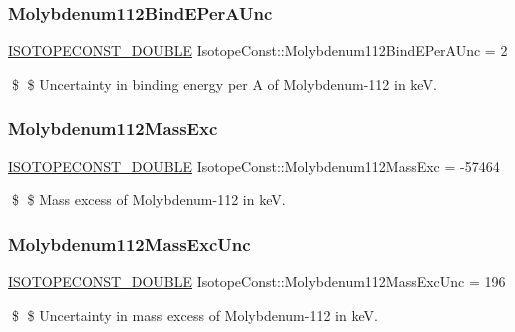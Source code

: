 \subsubsection{\texorpdfstring{Molybdenum112\+Bind\+E\+Per\+A\+Unc}{Molybdenum112BindEPerAUnc}}
{\footnotesize\ttfamily \mbox{\hyperlink{group___isotope_const-_macros_ga8f45a7272ce02c0b4c65c44636ed719a}{I\+S\+O\+T\+O\+P\+E\+C\+O\+N\+S\+T\+\_\+\+D\+O\+U\+B\+LE}} Isotope\+Const\+::\+Molybdenum112\+Bind\+E\+Per\+A\+Unc = 2}

\$ \$ Uncertainty in binding energy per A of Molybdenum-\/112 in keV. \mbox{\label{group___isotope_const-_molybdenum-_mo112_gad7d3bac05bf3c8750a58a16535177725}} 
\subsubsection{\texorpdfstring{Molybdenum112\+Mass\+Exc}{Molybdenum112MassExc}}
{\footnotesize\ttfamily \mbox{\hyperlink{group___isotope_const-_macros_ga8f45a7272ce02c0b4c65c44636ed719a}{I\+S\+O\+T\+O\+P\+E\+C\+O\+N\+S\+T\+\_\+\+D\+O\+U\+B\+LE}} Isotope\+Const\+::\+Molybdenum112\+Mass\+Exc = -\/57464}

\$ \$ Mass excess of Molybdenum-\/112 in keV. \mbox{\label{group___isotope_const-_molybdenum-_mo112_gab8663ca6f43a5a19ab38d37625e9462f}} 
\subsubsection{\texorpdfstring{Molybdenum112\+Mass\+Exc\+Unc}{Molybdenum112MassExcUnc}}
{\footnotesize\ttfamily \mbox{\hyperlink{group___isotope_const-_macros_ga8f45a7272ce02c0b4c65c44636ed719a}{I\+S\+O\+T\+O\+P\+E\+C\+O\+N\+S\+T\+\_\+\+D\+O\+U\+B\+LE}} Isotope\+Const\+::\+Molybdenum112\+Mass\+Exc\+Unc = 196}

\$ \$ Uncertainty in mass excess of Molybdenum-\/112 in keV. \mbox{\label{group___isotope_const-_molybdenum-_mo112_ga7377770d1130c20cd087e460c3e79240}} 
